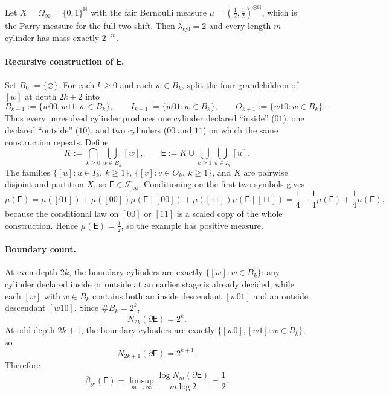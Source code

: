 \begin{example}
\label{ex:self-similar-bernoulli}
Let $X=\Omega_\infty=\{0,1\}^{\mathbb{N}}$ with the fair Bernoulli measure
$\mu=(\tfrac12,\tfrac12)^{\otimes\mathbb{N}}$, which is the Parry measure for
the full two-shift.  Then $\lambda_{\mathrm{cyl}}=2$ and every length-$m$
cylinder has mass exactly $2^{-m}$.

\paragraph{Recursive construction of $\mathsf{E}$.}
Set $B_0:=\{\varnothing\}$.  For each $k\ge 0$ and each $w\in B_k$, split the
four grandchildren of $[w]$ at depth $2k+2$ into
\[
B_{k+1}:=\{w00,w11:w\in B_k\},\qquad
I_{k+1}:=\{w01:w\in B_k\},\qquad
O_{k+1}:=\{w10:w\in B_k\}.
\]
Thus every unresolved cylinder produces one cylinder declared
``inside'' ($01$), one declared ``outside'' ($10$), and two cylinders
($00$ and $11$) on which the same construction repeats.  Define
\[
K:=\bigcap_{k\ge 0}\bigcup_{w\in B_k}[w],
\qquad
\mathsf{E}:=K\cup\bigcup_{k\ge 1}\bigcup_{u\in I_k}[u].
\]
The families $\{[u]:u\in I_k,\ k\ge 1\}$, $\{[v]:v\in O_k,\ k\ge 1\}$, and $K$
are pairwise disjoint and partition $X$, so $\mathsf{E}\in\mathcal{F}_\infty$.
Conditioning on the first two symbols gives
\[
\mu(\mathsf{E})
=\mu([01])+\mu([00])\mu(\mathsf{E}\mid[00])+\mu([11])\mu(\mathsf{E}\mid[11])
=\frac14+\frac14\mu(\mathsf{E})+\frac14\mu(\mathsf{E}),
\]
because the conditional law on $[00]$ or $[11]$ is a scaled copy of the whole
construction.  Hence $\mu(\mathsf{E})=\frac12$, so the example has positive
measure.

\paragraph{Boundary count.}
At even depth $2k$, the boundary cylinders are exactly $\{[w]:w\in B_k\}$:
any cylinder declared inside or outside at an earlier stage is already
decided, while each $[w]$ with $w\in B_k$ contains both an inside descendant
$[w01]$ and an outside descendant $[w10]$.  Since $\#B_k=2^k$,
\[
N_{2k}(\partial\mathsf{E})=2^k.
\]
At odd depth $2k+1$, the boundary cylinders are exactly
$\{[w0],[w1]:w\in B_k\}$, so
\[
N_{2k+1}(\partial\mathsf{E})=2^{k+1}.
\]
Therefore
\[
\overline{\beta}_{\mathcal{F}}(\mathsf{E})
=\limsup_{m\to\infty}\frac{\log N_m(\partial\mathsf{E})}{m\log 2}
=\frac12.
\]


\end{example}
